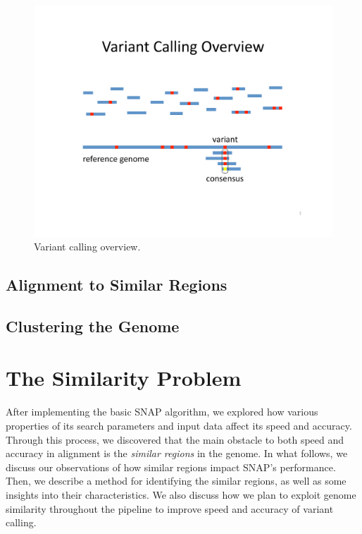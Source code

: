 \documentclass[twocolumn,10pt]{article}
\begin{document}
\begin{figure}
\centering
\includegraphics[scale=0.6]{variantCalling.pdf}
\caption{Variant calling overview.}
\label{fig:variantCalling}
\end{figure}

\subsection{Alignment to Similar Regions}

\subsection{Clustering the Genome}
\label{section:clusteringTheGenome}

\section{The Similarity Problem}
\label{section:similarityProblem}

After implementing the basic SNAP algorithm, we explored how various properties of its search parameters and input data affect its speed and accuracy.  Through this process, we discovered that the main obstacle to both speed and accuracy in alignment is the \textit{similar regions} in the genome.  In what follows, we discuss our observations of how similar regions impact SNAP's performance.  Then, we describe a method for identifying the similar regions, as well as some insights into their characteristics.  We also discuss how we plan to exploit genome similarity throughout the pipeline to improve speed and accuracy of variant calling.
\end{document}
